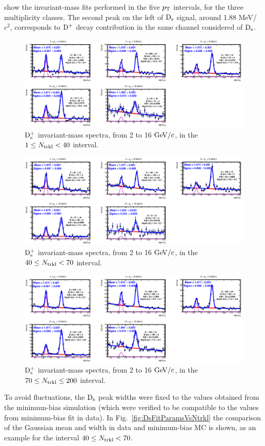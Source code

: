 show the invariant-mass fits performed in the five $p_{\rm T}$ intervals, for the three 
multiplicity classes. The second peak on the left of ${\rm D_s}$ signal, around 1.88 MeV/$c^2$,
corresponds to ${\rm D^+}$ decay contribution in the same channel considered of ${\rm D_s}$.
\begin{figure}[htpb]
\centering
 \includegraphics[width=1\textwidth]{FigCap6/DsMass_140Trkl.eps}
  \caption{${\rm D_s^+}$ invariant-mass spectra, from 2 to 16 $\mathrm{GeV}/c$, in the $1 \leq N_{\rm trkl} < 40$ interval.}
 \label{fig:DsInvMassVsNtrkl_1}
\end{figure}
\begin{figure}[htpb]
\centering
 \includegraphics[width=1\textwidth]{FigCap6/DsMass_4070Trkl.eps}
  \caption{${\rm D_s^+}$ invariant-mass spectra, from 2 to 16 $\mathrm{GeV}/c$, in the $40 \leq N_{\rm trkl} < 70$ interval.}
 \label{fig:DsInvMassVsNtrkl_2}
\end{figure}
\begin{figure}[htpb]
\centering
 \includegraphics[width=1\textwidth]{FigCap6/DsMass_70200Trkl.eps}
  \caption{${\rm D_s^+}$ invariant-mass spectra, from 2 to 16 $\mathrm{GeV}/c$, in the $70 \leq N_{\rm trkl} \leq 200$ interval.}
 \label{fig:DsInvMassVsNtrkl_3}
\end{figure}
To avoid fluctuations, the ${\rm D_s}$ peak widths were fixed to the values obtained from the 
minimum-bias simulation (which were verified to be compatible to the values
from minimum-bias fit in data). In Fig.~\ref{fig:DsFitParamsVsNtrkl} 
the comparison of the Gaussian mean and width 
in data and minimum-bias MC is shown, as an example for the interval $40 \leq N_{\rm trkl} < 70$. 


